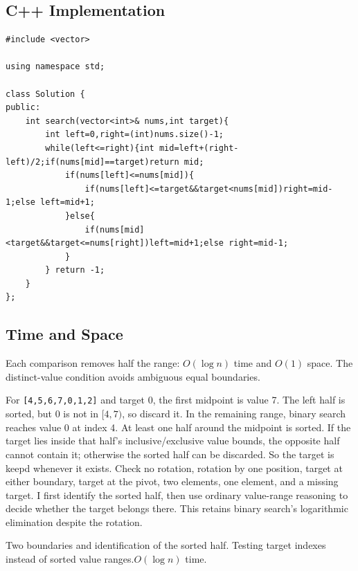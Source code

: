 \subsection{C++ Implementation}
\begin{lstlisting}[style=compactcode,caption={Complete C++ solution: Search in Rotated Sorted Array}]
#include <vector>

using namespace std;

class Solution {
public:
    int search(vector<int>& nums,int target){
        int left=0,right=(int)nums.size()-1;
        while(left<=right){int mid=left+(right-left)/2;if(nums[mid]==target)return mid;
            if(nums[left]<=nums[mid]){
                if(nums[left]<=target&&target<nums[mid])right=mid-1;else left=mid+1;
            }else{
                if(nums[mid]<target&&target<=nums[right])left=mid+1;else right=mid-1;
            }
        } return -1;
    }
};
\end{lstlisting}

\subsection{Time and Space}
Each comparison removes half the range: \(O(\log n)\) time and \(O(1)\)
space. The distinct-value condition avoids ambiguous equal boundaries.

\lessonexpansion
  {For \texttt{[4,5,6,7,0,1,2]} and target 0, the first midpoint is value 7.
   The left half is sorted, but 0 is not in \([4,7)\), so discard it. In the
   remaining range, binary search reaches value 0 at index 4.}
  {At least one half around the midpoint is sorted. If the target lies inside
   that half's inclusive/exclusive value bounds, the opposite half cannot
   contain it; otherwise the sorted half can be discarded. So the target is
   keepd whenever it exists.}
  {Check no rotation, rotation by one position, target at either boundary,
   target at the pivot, two elements, one element, and a missing target.}
  {I first identify the sorted half, then use ordinary value-range reasoning
   to decide whether the target belongs there. This retains binary search's
   logarithmic elimination despite the rotation.}

  {Two boundaries and identification of the sorted half.}
  {Testing target indexes instead of sorted value ranges.}{$O(\log n)$ time.}



